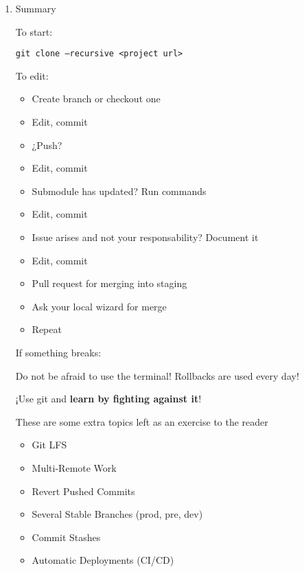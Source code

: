 \documentclass[12pt,a4paper]{article}
\begin{document}
\begin{enumerate}
\begin{tikzpicture}[
			node/.style={circle, draw, fill=black, inner sep=2pt}
			]
		\end{tikzpicture}
		
		\newpage
		\item Summary
		
		\vspace{1cm}
		
		To start:
		
		\texttt{git clone --recursive <project url>}
		
		To edit:
		\begin{itemize}
			\item Create branch or checkout one
			\item Edit, commit
			\item ¿Push?
			\item Edit, commit
			\item Submodule has updated? Run commands
			\item Edit, commit
			\item Issue arises and not your responsability? Document it
			\item Edit, commit
			\item Pull request for merging into staging
			\item Ask your local wizard for merge
			\item Repeat
		\end{itemize}
		
		If something breaks:
		
		Do not be afraid to use the terminal! Rollbacks are used every day!
		
		\vspace{3cm}
		¡Use git and \textbf{learn by fighting against it}!
		
		\vspace{2cm}
		These are some extra topics left as an exercise to the reader
		\begin{itemize} 
			\item Git LFS
			\item Multi-Remote Work
			\item Revert Pushed Commits
			\item Several Stable Branches (prod, pre, dev)
			\item Commit Stashes
			\item Automatic Deployments (CI/CD)
		\end{itemize}
		
		
		
	\end{enumerate}
	
	
\end{document}
